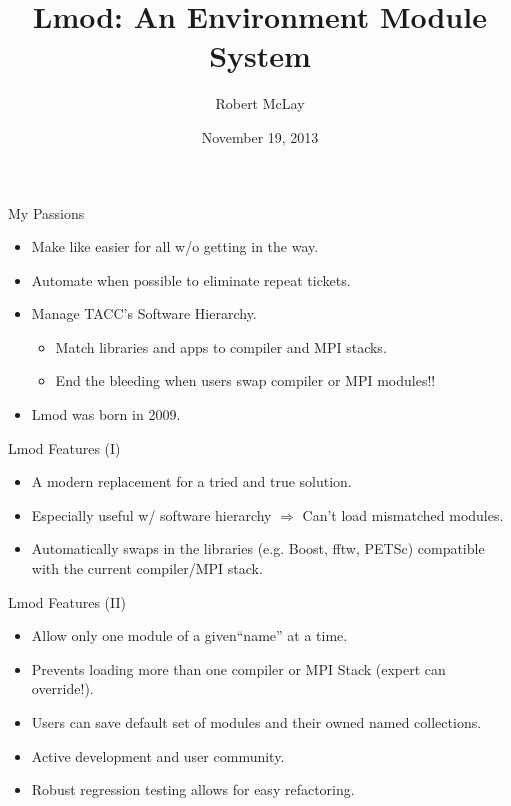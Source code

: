 \documentclass{beamer}
\title{Lmod: An Environment Module System}
\author{Robert McLay}
\institute{The Texas Advanced Computing Center}
\date{November 19, 2013}  %
\begin{document}
\begin{frame}
  \titlepage
\end{frame}

\begin{frame}{My Passions}
  \begin{itemize}
    \item Make like easier for all w/o getting in the way.
    \item Automate when possible to eliminate repeat tickets.
    \item Manage TACC's Software Hierarchy.
      \begin{itemize}
        \item Match libraries and apps to compiler and MPI stacks.
        \item End the bleeding  when users swap compiler or MPI modules!!
      \end{itemize}
    \item Lmod was born in 2009.

  \end{itemize}
\end{frame}

\begin{frame}{Lmod Features (I)}
  \begin{itemize}
    \item A modern replacement for a tried and true solution.
    \item Especially useful w/ software hierarchy $\Rightarrow$ Can't
      load mismatched modules.
    \item Automatically swaps in the libraries (e.g. Boost, fftw,
      PETSc) compatible with the current compiler/MPI stack.
  \end{itemize}
\end{frame}

\begin{frame}{Lmod Features (II)}
  \begin{itemize}
    \item Allow only one module of a given``name'' at a time.
    \item Prevents loading more than one compiler or
      MPI Stack (expert can override!).
    \item Users can save default set of modules and their owned  named collections.
    \item Active development and user community.
    \item Robust regression testing allows for easy refactoring.
  \end{itemize}
\end{frame}
\end{document}
